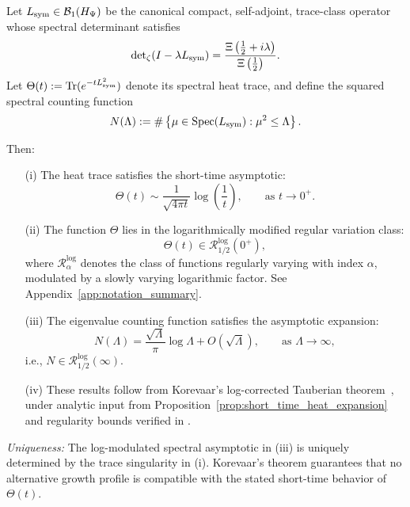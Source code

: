 \begin{lemma}
\label{lem:log_corrected_tauberian_estimate}

Let \( L_{\mathrm{sym}} \in \mathcal{B}_1(H_{\Psi}) \) be the canonical compact, self-adjoint, trace-class operator whose spectral determinant satisfies
\[
\det\nolimits_\zeta(I - \lambda L_{\mathrm{sym}}) = \frac{\Xi\left( \tfrac{1}{2} + i\lambda \right)}{\Xi\left( \tfrac{1}{2} \right)}.
\]
Let \( \Theta(t) := \operatorname{Tr}(e^{-t L_{\mathrm{sym}}^2}) \) denote its spectral heat trace, and define the squared spectral counting function
\[
N(\Lambda) := \#\left\{ \mu \in \operatorname{Spec}(L_{\mathrm{sym}}) : \mu^2 \le \Lambda \right\}.
\]

Then:

\begin{enumerate}
  \item[\textup{(i)}] The heat trace satisfies the short-time asymptotic:
  \[
  \Theta(t) \sim \frac{1}{\sqrt{4\pi t}} \log\left(\frac{1}{t}\right), \qquad \text{as } t \to 0^+.
  \]

  \item[\textup{(ii)}] The function \( \Theta \) lies in the logarithmically modified regular variation class:
  \[
  \Theta(t) \in \mathcal{R}_{1/2}^{\log}(0^+),
  \]
  where \( \mathcal{R}_{\alpha}^{\log} \) denotes the class of functions regularly varying with index \( \alpha \), modulated by a slowly varying logarithmic factor. See Appendix~\ref{app:notation_summary}.

  \item[\textup{(iii)}] The eigenvalue counting function satisfies the asymptotic expansion:
  \[
  N(\Lambda) = \frac{\sqrt{\Lambda}}{\pi} \log \Lambda + O(\sqrt{\Lambda}),
  \qquad \text{as } \Lambda \to \infty,
  \]
  i.e., \( N \in \mathcal{R}_{1/2}^{\log}(\infty) \).

  \item[\textup{(iv)}] These results follow from Korevaar’s log-corrected Tauberian theorem~\cite[Ch.~III, §5]{Korevaar2004Tauberian}, under analytic input from Proposition~\ref{prop:short_time_heat_expansion} and regularity bounds verified in .
\end{enumerate}

\medskip

\noindent
\emph{Uniqueness:} The log-modulated spectral asymptotic in (iii) is uniquely determined by the trace singularity in (i). Korevaar's theorem guarantees that no alternative growth profile is compatible with the stated short-time behavior of \( \Theta(t) \).
\end{lemma}
